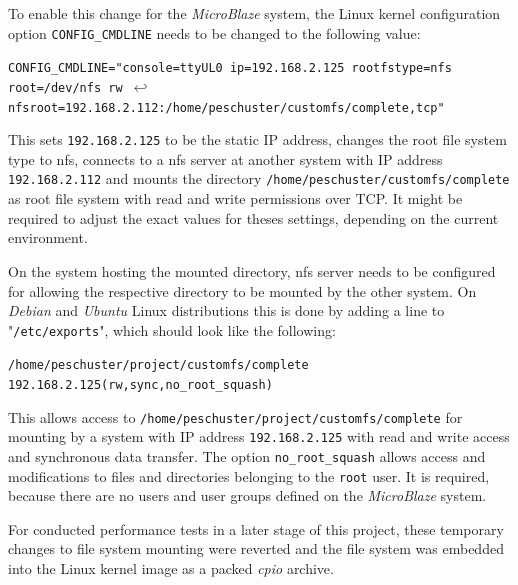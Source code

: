 To enable this change for the \textit{MicroBlaze} system, the Linux kernel configuration option \texttt{CONFIG\_CMDLINE} needs to be changed to the following value:

\texttt{CONFIG\_CMDLINE="console=ttyUL0 ip=192.168.2.125 rootfstype=nfs root=/dev/nfs rw $ \hookleftarrow$\\  nfsroot=192.168.2.112:/home/peschuster/customfs/complete,tcp"} %

This sets \texttt{192.168.2.125} to be the static IP address, changes the root file system type to \gls{nfs}, connects to a \gls{nfs} server at another system with IP address \texttt{192.168.2.112} and mounts the directory \texttt{/home/peschuster/customfs/complete} as root file system with read and write permissions over TCP. It might be required to adjust the exact values for theses settings, depending on the current environment.

On the system hosting the mounted directory, \gls{nfs} server needs to be configured for allowing the respective directory to be mounted by the other system. On \textit{Debian} and \textit{Ubuntu} Linux distributions this is done by adding a line to "\texttt{/etc/exports}", which should look like the following: 

\texttt{/home/peschuster/project/customfs/complete	192.168.2.125(rw,sync,no\_root\_squash)}

This allows access to \texttt{/home/peschuster/project/customfs/complete} for mounting by a system with IP address \texttt{192.168.2.125} with read and write access and synchronous data transfer. The option \texttt{no\_root\_squash} allows access and modifications to files and directories belonging to the \texttt{root} user. It is required, because there are no users and user groups defined on the \textit{MicroBlaze} system.

For conducted performance tests in a later stage of this project, these temporary changes to file system mounting were reverted and the file system was embedded into the Linux kernel image as a packed \textit{cpio} archive.